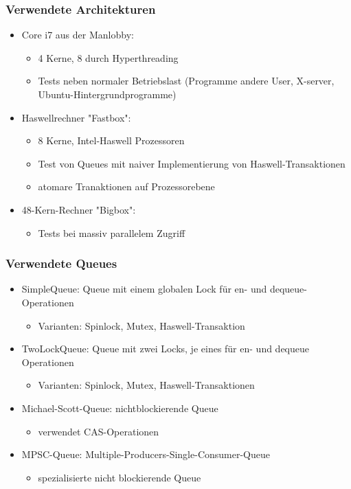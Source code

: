 \documentclass[svgnames]{beamer}
\begin{document}
\begin{frame}
\frametitle{Verwendete Architekturen}
\begin{itemize}
 \item Core i7 aus der Manlobby:
\begin{itemize}
 \item 4 Kerne, 8 durch Hyperthreading
 \item Tests neben normaler Betriebslast (Programme andere User, X-server, Ubuntu-Hintergrundprogramme)
\end{itemize}
 \item Haswellrechner "Fastbox":
\begin{itemize}
 \item 8 Kerne, Intel-Haswell Prozessoren
 \item Test von Queues mit naiver Implementierung von Haswell-Transaktionen
 \item atomare Tranaktionen auf Prozessorebene
\end{itemize}
 \item 48-Kern-Rechner "Bigbox":
\begin{itemize}
 \item Tests bei massiv parallelem Zugriff
\end{itemize}
\end{itemize}
\end{frame}

\begin{frame}
\frametitle{Verwendete Queues}
\begin{itemize}
 \item SimpleQueue: Queue mit einem globalen Lock f\"ur en- und dequeue-Operationen
\begin{itemize}
 \item Varianten: Spinlock, Mutex, Haswell-Transaktion
\end{itemize}
 \item TwoLockQueue: Queue mit zwei Locks, je eines f\"ur en- und dequeue Operationen
\begin{itemize}
 \item Varianten: Spinlock, Mutex, Haswell-Transaktionen
\end{itemize}
 \item Michael-Scott-Queue: nichtblockierende Queue
\begin{itemize}
 \item verwendet CAS-Operationen
\end{itemize}
 \item MPSC-Queue: Multiple-Producers-Single-Consumer-Queue
\begin{itemize}
\item spezialisierte nicht blockierende Queue
\end{itemize}
\end{itemize}
\end{frame}
\end{document}
